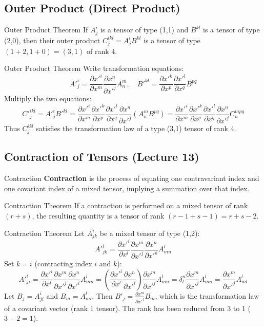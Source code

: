 \documentclass[11pt,a4paper]{article}
\begin{document}
\subsection{Outer Product (Direct Product)}
\begin{theorembox}{Outer Product Theorem}
If $A^i_j$ is a tensor of type (1,1) and $B^{kl}$ is a tensor of type (2,0), then their outer product $C^{ikl}_j = A^i_j B^{kl}$ is a tensor of type $(1+2, 1+0) = (3,1)$ of rank 4.
\end{theorembox}
\begin{proofbox}{Outer Product Theorem}
Write transformation equations:
\[
A'^i_j = \frac{\partial x'^i}{\partial x^m} \frac{\partial x^n}{\partial x'^j} A^m_n, \quad B'^{kl} = \frac{\partial x'^k}{\partial x^p} \frac{\partial x'^l}{\partial x^q} B^{pq}
\]
Multiply the two equations:
\[
C'^{ikl}_j = A'^i_j B'^{kl} = \frac{\partial x'^i}{\partial x^m} \frac{\partial x'^k}{\partial x^p} \frac{\partial x'^l}{\partial x^q} \frac{\partial x^n}{\partial x'^j} (A^m_n B^{pq}) = \frac{\partial x'^i}{\partial x^m} \frac{\partial x'^k}{\partial x^p} \frac{\partial x'^l}{\partial x^q} \frac{\partial x^n}{\partial x'^j} C^{mpq}_n
\]
Thus $C^{ikl}_j$ satisfies the transformation law of a type (3,1) tensor of rank 4.
\end{proofbox}

\subsection{Contraction of Tensors (Lecture 13)}
\begin{definitionbox}{Contraction}
\textbf{Contraction} is the process of equating one contravariant index and one covariant index of a mixed tensor, implying a summation over that index.
\end{definitionbox}

\begin{theorembox}{Contraction Theorem}
If a contraction is performed on a mixed tensor of rank $(r+s)$, the resulting quantity is a tensor of rank $(r-1 + s-1) = r+s-2$.
\end{theorembox}
\begin{proofbox}{Contraction Theorem}
Let $A^i_{jk}$ be a mixed tensor of type (1,2):
\[
A'^i_{jk} = \frac{\partial x'^i}{\partial x^l} \frac{\partial x^m}{\partial x'^j} \frac{\partial x^n}{\partial x'^k} A^l_{mn}
\]
Set $k = i$ (contracting index $i$ and $k$):
\[
A'^i_{ji} = \frac{\partial x'^i}{\partial x^l} \frac{\partial x^m}{\partial x'^j} \frac{\partial x^n}{\partial x'^i} A^l_{mn} = \left( \frac{\partial x'^i}{\partial x^l} \frac{\partial x^n}{\partial x'^i} \right) \frac{\partial x^m}{\partial x'^j} A^l_{mn} = \delta^n_l \frac{\partial x^m}{\partial x'^j} A^l_{mn} = \frac{\partial x^m}{\partial x'^j} A^l_{ml}
\]
Let $B_j = A^i_{ji}$ and $B_m = A^l_{ml}$. Then $B'_j = \frac{\partial x^m}{\partial x'^j} B_m$, which is the transformation law of a covariant vector (rank 1 tensor). The rank has been reduced from 3 to 1 ($3 - 2 = 1$).
\end{proofbox}
\end{document}
